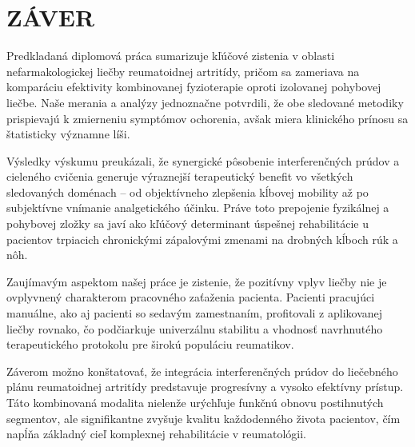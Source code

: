 \chapter*{ZÁVER}

Predkladaná diplomová práca sumarizuje kľúčové zistenia v oblasti nefarmakologickej liečby reumatoidnej artritídy, pričom sa zameriava na komparáciu efektivity kombinovanej fyzioterapie oproti izolovanej pohybovej liečbe. Naše merania a analýzy jednoznačne potvrdili, že obe sledované metodiky prispievajú k zmierneniu symptómov ochorenia, avšak miera klinického prínosu sa štatisticky významne líši.

Výsledky výskumu preukázali, že synergické pôsobenie interferenčných prúdov a cieleného cvičenia generuje výraznejší terapeutický benefit vo všetkých sledovaných doménach – od objektívneho zlepšenia kĺbovej mobility až po subjektívne vnímanie analgetického účinku. Práve toto prepojenie fyzikálnej a pohybovej zložky sa javí ako kľúčový determinant úspešnej rehabilitácie u pacientov trpiacich chronickými zápalovými zmenami na drobných kĺboch rúk a nôh.

Zaujímavým aspektom našej práce je zistenie, že pozitívny vplyv liečby nie je ovplyvnený charakterom pracovného zaťaženia pacienta. Pacienti pracujúci manuálne, ako aj pacienti so sedavým zamestnaním, profitovali z aplikovanej liečby rovnako, čo podčiarkuje univerzálnu stabilitu a vhodnosť navrhnutého terapeutického protokolu pre širokú populáciu reumatikov.

Záverom možno konštatovať, že integrácia interferenčných prúdov do liečebného plánu reumatoidnej artritídy predstavuje progresívny a vysoko efektívny prístup. Táto kombinovaná modalita nielenže urýchľuje funkčnú obnovu postihnutých segmentov, ale signifikantne zvyšuje kvalitu každodenného života pacientov, čím napĺňa základný cieľ komplexnej rehabilitácie v reumatológii.
